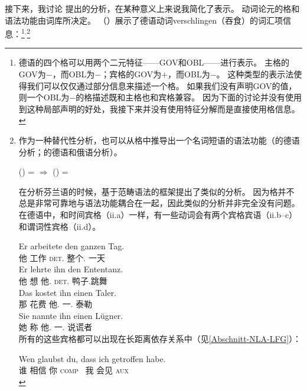 接下来，我讨论 \citet[\S~2.1.3]{Berman96a-u}提出的分析，在某种意义上来说我简化了表示。
动词论元的格和语法功能由词库所决定\citep[]{Berman96a-u}。
（）展示了德语动词verschlingen（吞食）的词汇项信息：\footnote{%
  德语的四个格可以用两个二元特征——{\small GOV}和{\small OBL}——进行表示\citep[]{Berman96a-u}。
  主格的{\small GOV}为$-$，而{\small OBL}为$-$；宾格的{\small GOV}为$+$，而{\small OBL}为$-$。
  这种类型的表示法使得我们可以仅仅通过部分信息来描述一个格。
  如果我们没有声明{\small GOV}的值，则一个{\small OBL}为$-$的格描述既和主格也和宾格兼容。
  因为下面的讨论并没有使用到这种局部声明的好处，我接下来并没有使用特征分解而是直接使用格信息。
}$^,$\footnote{%
  作为一种替代性分析，也可以从格中推导出一个名词短语的语法功能（\citealp[]{Berman2003a}的德语分析；\citealp[, ]{Bresnan2001a}的德语和俄语分析）。

\ea
\label{Kasus-Implikation-Berman}
\upshape      (\downsp \case) = \mdacc{} $\Rightarrow$ (\upsp \lfgobj) = \down{}
\z

\noindent
   \citet[\S~2.1]{Karttunen89a-u}在分析芬兰语的时候，基于范畴语法\indexcxgc 的框架提出了类似的分析。
  因为格并不总是非常可靠地与语法功能耦合在一起，因此类似的分析并非完全没有问题。
  在德语中，和时间宾格（ii.a）一样，有一些动词会有两个宾格宾语（ii.b--c）和谓词性宾格（ii.d）。

\eal
\ex 
\gll Er arbeitete den ganzen Tag.\\
     他 工作 \textsc{det}.\acc{} 整个.\acc{} 一天\\
\ex 
\gll Er lehrte ihn den Ententanz.\\
     他 想 他.\acc{} \textsc{det}.\acc{} 鸭子.跳舞\\
\ex 
\gll Das kostet ihn einen Taler.\\
     那 花费 他.\acc{} 一.\acc{} 泰勒\\
\ex 
\gll Sie nannte ihn einen Lügner.\\
     她 称 他.\acc{} 一.\acc{} 说谎者\\
\zl
所有的这些宾格都可以出现在长距离依存关系中（见\ref{Abschnitt-NLA-LFG}）：

\ea
\gll Wen glaubst du, dass ich getroffen habe.\\
    谁 相信 你 \textsc{comp}  我 会见 \textsc{aux} \\
\z

}
